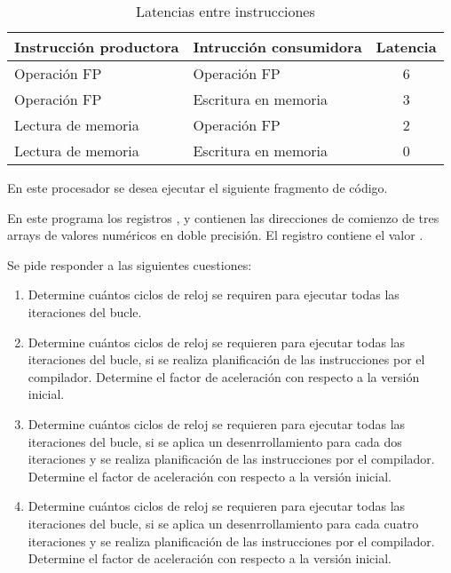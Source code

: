 \begin{table}[htb]
\begin{tabular}{|l|l|c|}
\hline
\textbf{Instrucción productora} &
\textbf{Intrucción consumidora} &
\textbf{Latencia}
\\
\hline

Operación FP & Operación FP & 6\\
\hline

Operación FP & Escritura en memoria & 3\\
\hline

Lectura de memoria & Operación FP & 2\\
\hline

Lectura de memoria & Escritura en memoria & 0\\
\hline

\end{tabular}
\caption{Latencias entre instrucciones}
\label{tab:unroll-1:latencies}
\end{table}

En este procesador se desea ejecutar el siguiente fragmento de código.



En este programa los registros ,  y  contienen
las direcciones de comienzo de tres arrays de valores numéricos en doble
precisión. El registro  contiene el valor .

Se pide responder a las siguientes cuestiones:

\begin{enumerate}

  \item Determine cuántos ciclos de reloj se requiren para ejecutar todas
        las iteraciones del bucle.

  \item Determine cuántos ciclos de reloj se requieren para ejecutar todas
        las iteraciones del bucle, si se realiza planificación de las instrucciones
        por el compilador. 
        Determine el factor de aceleración con respecto a la versión inicial.

  \item Determine cuántos ciclos de reloj se requieren para ejecutar todas
        las iteraciones del bucle, si se aplica un desenrrollamiento para cada dos iteraciones
        y se realiza planificación de las instrucciones por el compilador.
        Determine el factor de aceleración con respecto a la versión inicial.

  \item Determine cuántos ciclos de reloj se requieren para ejecutar todas
        las iteraciones del bucle, si se aplica un desenrrollamiento para cada cuatro iteraciones
        y se realiza planificación de las instrucciones por el compilador.
        Determine el factor de aceleración con respecto a la versión inicial.

\end{enumerate}

